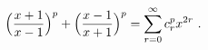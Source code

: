 \begin{equation}
  \Bigl(\frac{x+1}{x-1}\Bigr)^p + \Bigl(\frac{x-1}{x+1}\Bigr)^p =
  \sum_{r=0}^\infty c_r^p x^{2r}\ . 
\end{equation}

